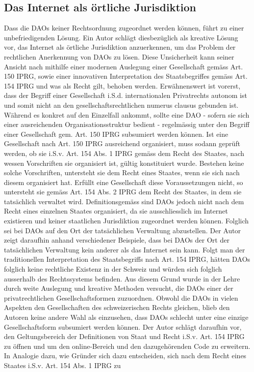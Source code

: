 \documentclass[a4paper,12pt]{report}
\begin{document}
    \subsection{Das Internet als örtliche Jurisdiktion}
	\startsubsection
	Dass die DAOs keiner Rechtsordnung zugeordnet werden können, führt zu einer unbefriedigenden Lösung. Ein Autor schlägt diesbezüglich als kreative Lösung vor, das Internet als örtliche Jurisdiktion anzuerkennen, um das Problem der rechtlichen Anerkennung von DAOs zu lösen. Diese Unsicherheit kann seiner Ansicht nach mithilfe einer modernen Auslegung einer Gesellschaft gemäss Art. 150 IPRG, sowie einer innovativen Interpretation des Staatsbegriffes gemäss Art. 154 IPRG und was als Recht gilt, behoben werden. Erwähnenswert ist vorerst, dass der Begriff einer Gesellschaft i.S.d. internationalen Privatrechts autonom ist und somit nicht an den gesellschaftsrechtlichen numerus clausus gebunden ist. Während es konkret auf den Einzelfall ankommt, sollte eine DAO - sofern sie sich einer ausreichenden Organisationsstruktur bedient - regelmässig unter den Begriff einer Gesellschaft gem. Art. 150 IPRG subsumiert werden können. Ist eine Gesellschaft nach Art. 150 IPRG ausreichend organisiert, muss sodann geprüft werden, ob sie i.S.v. Art. 154 Abs. 1 IPRG gemäss dem Recht des Staates, nach wessen Vorschriften sie organisiert ist, gültig konstituiert wurde. Bestehen keine solche Vorschriften, untersteht sie dem Recht eines Staates, wenn sie sich nach diesem organisiert hat. Erfüllt eine Gesellschaft diese Voraussetzungen nicht, so untersteht sie gemäss Art. 154 Abs. 2 IPRG dem Recht des Staates, in dem sie tatsächlich verwaltet wird. Definitionsgemäss sind DAOs jedoch nicht nach dem Recht eines einzelnen Staates organisiert, da sie ausschliesslich im Internet existieren und keiner staatlichen Jurisdiktion zugeordnet werden können. Folglich sei bei DAOs auf den Ort der tatsächlichen Verwaltung abzustellen. Der Autor zeigt daraufhin anhand verschiedener Beispiele, dass bei DAOs der Ort der tatsächlichen Verwaltung kein anderer als das Internet sein kann. Folgt man der traditionellen Interpretation des Staatsbegriffs nach Art. 154 IPRG, hätten DAOs folglich keine rechtliche Existenz in der Schweiz und würden sich folglich ausserhalb des Rechtssystems befinden. Aus diesem Grund wurde in der Lehre durch weite Auslegung und kreative Methoden versucht, die DAOs einer der privatrechtlichen Gesellschaftsformen zuzuordnen. Obwohl die DAOs in vielen Aspekten den Gesellschaften des schweizerischen Rechts gleichen, blieb den Autoren keine andere Wahl als einzusehen, dass DAOs schlecht unter eine einzige Gesellschaftsform subsumiert werden können. Der Autor schlägt daraufhin vor, den Geltungsbereich der Definitionen von Staat und Recht i.S.v. Art. 154 IPRG zu öffnen und um den online-Bereich und den dazugehörenden Code zu erweitern. In Analogie dazu, wie Gründer sich dazu entscheiden, sich nach dem Recht eines Staates i.S.v. Art. 154 Abs. 1 IPRG zu 
\end{document}
